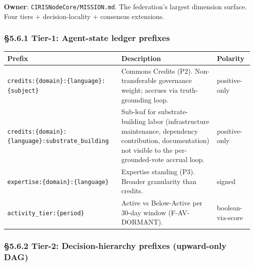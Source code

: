 \documentclass[11pt]{article}
\begin{document}
\textbf{Owner}: \texttt{CIRISNodeCore/MISSION.md}. The federation's largest dimension surface. Four tiers + decision-locality + consensus extensions.


\subsubsection*{§5.6.1 Tier-1: Agent-state ledger prefixes}


{\footnotesize
\begin{longtable}{|p{5.33cm}|p{5.33cm}|p{5.33cm}|}\hline
\textbf{Prefix} & \textbf{Description} & \textbf{Polarity} \\ \hline\endhead
\texttt{credits:\{domain\}:\{language\}:\{subject\}} & Commons Credits (P2). Non-transferable governance weight; accrues via truth-grounding loop. & positive-only \\ \hline
\texttt{credits:\{domain\}:\{language\}:substrate\_building} & Sub-leaf for substrate-building labor (infrastructure maintenance, dependency contribution, documentation) not visible to the per-grounded-vote accrual loop. & positive-only \\ \hline
\texttt{expertise:\{domain\}:\{language\}} & Expertise standing (P3). Broader granularity than credits. & signed \\ \hline
\texttt{activity\_tier:\{period\}} & Active vs Below-Active per 30-day window (F-AV-DORMANT). & boolean-via-score \\ \hline
\end{longtable}}


\subsubsection*{§5.6.2 Tier-2: Decision-hierarchy prefixes (upward-only DAG)}
\end{document}
